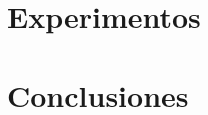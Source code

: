 \documentclass[spanish,12pt,letterpaper,oneside]{book}
\begin{document}
\begin{spacing}{.97}
        \chapter{Experimentos}
        \label{ch:experimentos}
        

        \chapter{Conclusiones}
        \label{ch:conclusiones}
        

        
        
        \nocite{*}
    \end{spacing}
\end{document}
